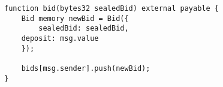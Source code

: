\begin{lstlisting}[language=Solidity]
function bid(bytes32 sealedBid) external payable {
	Bid memory newBid = Bid({
		sealedBid: sealedBid,
	deposit: msg.value
	});
	
	bids[msg.sender].push(newBid);
}
\end{lstlisting}